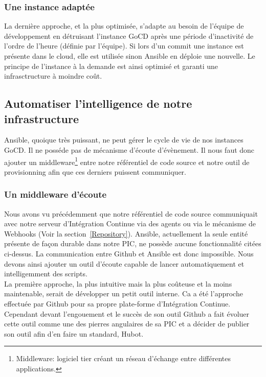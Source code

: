           \subsubsection{Une instance adaptée}
        La dernière approche, et la plus optimisée, s'adapte au besoin de l'équipe de développement en détruisant l'instance GoCD après une période d'inactivité de l'ordre de l'heure (définie par l'équipe). Si lors d'un commit une instance est présente dans le cloud, elle est utilisée sinon Ansible en déploie une nouvelle. Le principe de l'instance à la demande est ainsi optimisé et garanti une infrasctructure à moindre coût.

        \subsection{Automatiser l'intelligence de notre infrastructure}
        Ansible, quoique très puissant, ne peut gérer le cycle de vie de nos instances GoCD. Il ne posséde pas de mécanisme d'écoute d'évènement. Il nous faut donc ajouter un middleware\footnote{Middleware: logiciel tier créant un réseau d'échange entre différentes applications.} entre notre référentiel de code source et notre outil de provisionning afin que ces derniers puissent communiquer.\\

          \subsubsection{Un middleware d'écoute}
          Nous avons vu précédemment que notre référentiel de code source communiquait avec notre serveur d'Intégration Continue via des agents ou via le mécanisme de Webhooks (Voir la section~\ref{Repository}). Ansible, actuellement la seule entité présente de façon durable dans notre PIC, ne possède aucune fonctionnalité citées ci-dessus. La communication entre Github et Ansible est donc impossible. Nous devons ainsi ajouter un outil d'écoute capable de lancer automatiquement et intelligemment des scripts.\\

          La première approche, la plus intuitive mais la plus coûteuse et la moins maintenable, serait de développer un petit outil interne. Ca a été l'approche effectuée par Github pour sa propre plate-forme d'Intégration Continue. Cependant devant l'engouement et le succès de son outil Github a fait évoluer cette outil comme une des pierres angulaires de sa PIC et a décider de publier son outil afin d'en faire un standard, Hubot.


